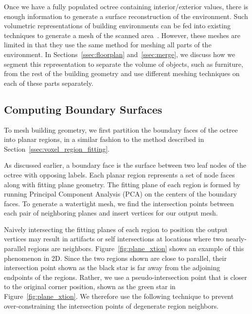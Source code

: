 \documentclass[12pt,onecolumn,oneside]{book}
\begin{document}
Once we have a fully populated octree containing interior/exterior values, there is enough information to generate a surface reconstruction of the environment.  Such volumetric representations of building environments can be fed into existing techniques to generate a mesh of the scanned area~\cite{Turner13,Kintinuous,Carving}.  However, these meshes are limited in that they use the same method for meshing all parts of the environment.  In Sections~\ref{ssec:floorplan} and~\ref{ssec:merge}, we discuss how we segment this representation to separate the volume of objects, such as furniture, from the rest of the building geometry and use different meshing techniques on each of these parts separately.

\subsection{Computing Boundary Surfaces}
\label{ssec:procarve_boundary}



To mesh building geometry, we first partition the boundary faces of the octree into planar regions, in a similar fashion to the method described in Section~\ref{ssec:voxel_region_fitting}.  

As discussed earlier, a boundary face is the surface between two leaf nodes of the octree with opposing labels.  Each planar region represents a set of node faces along with fitting plane geometry.  The fitting plane of each region is formed by running Principal Component Analysis (PCA) on the centers of the boundary faces.  To generate a watertight mesh, we find the intersection points between each pair of neighboring planes and insert vertices for our output mesh.  

Naively intersecting the fitting planes of each region to position the output vertices may result in artifacts or self intersections at locations where two nearly-parallel regions are neighbors.  Figure~\ref{fig:plane_xtion} shows an example of this phenomenon in 2D.  Since the two regions shown are close to parallel, their intersection point shown as the black star is far away from the adjoining endpoints of the regions.  Rather, we use a pseudo-intersection point that is closer to the original corner position, shown as the green star in Figure~\ref{fig:plane_xtion}.  We therefore use the following technique to prevent over-constraining the intersection points of degenerate region neighbors.
\end{document}
